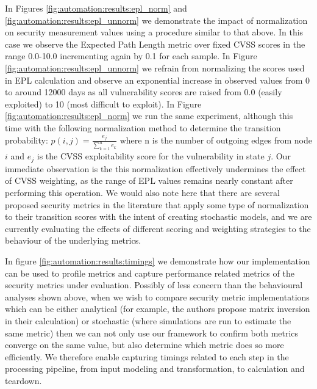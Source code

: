 In Figures \ref{fig:automation:results:epl_norm} and \ref{fig:automation:results:epl_unnorm} we demonstrate the impact of normalization on security measurement values using a procedure similar to that above. In this case we observe the Expected Path Length\cite{Abraham_Nair_2014}  metric over fixed CVSS scores in the range 0.0-10.0 incrementing again by 0.1 for each sample. In Figure \ref{fig:automation:results:epl_unnorm} we refrain from normalizing the scores used in EPL calculation and observe an exponential increase in observed values from 0 to around 12000 days as all vulnerability scores are raised from 0.0 (easily exploited) to 10 (most difficult to exploit). In Figure  \ref{fig:automation:results:epl_norm} we run the same experiment, although this time with the following normalization method to determine the transition probability: $p(i,j)=\frac{e_j}{\sum_{k=1}^{n}e_k}$ where n is the number of outgoing edges from node $i$ and $e_j$ is the CVSS exploitability score for the vulnerability in state $j$. Our immediate observation is the this normalization effectively undermines the effect of CVSS weighting, as the range of EPL values remains nearly constant after performing this operation. We would also note here that there are several proposed security metrics in the literature that apply some type of normalization to their transition scores with the intent of creating stochastic models, and we are currently evaluating the effects of different scoring and weighting strategies to the behaviour of the underlying metrics. 

In figure \ref{fig:automation:results:timings} we demonstrate how our implementation can be used to profile metrics and capture performance related metrics of the security metrics under evaluation. Possibly of less concern than the behavioural analyses shown above, when we wish to compare security metric implementations which can be either analytical (for example, the authors propose matrix inversion in their calculation) or stochastic (where simulations are run to estimate the same metric) then we can not only use our framework to confirm both metrics converge on the same value, but also determine which metric does so more efficiently. We therefore enable capturing timings related to each step in the processing pipeline, from input modeling and transformation, to calculation and teardown.



    
